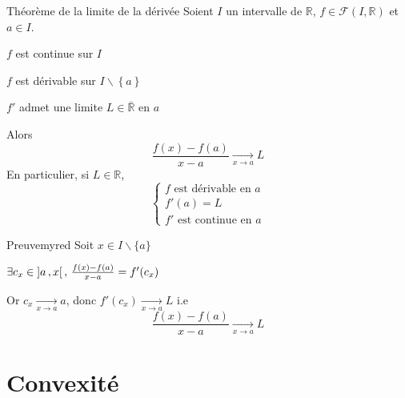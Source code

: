     \begin{theo}{Théorème de la limite de la dérivée}{}
        Soient $I$ un intervalle de $\mathbb{R}$, $f \in \mathcal{F}(I,\mathbb{R})$ et $a \in I$. 

        \begin{suppose}
            \item $f$ est continue sur $I$
            \item $f$ est dérivable sur $I \backslash \left\{ a \right\}$
            \item $f'$ admet une limite $L \in \bar{\mathbb{R}}$ en $a$
        \end{suppose}
        Alors \[ \frac{f(x)-f(a)}{x-a} \underset{x \rightarrow a}{\longrightarrow} L \]
        En particulier, si $L \in \mathbb{R}$, 
        \[ \left\{ \begin{array}{lll}
            f \text{ est dérivable en } a \\
            f'(a) = L \\
            f' \text{ est continue en } a
        \end{array} \right. \]
    \end{theo}

    \begin{demo}{Preuve}{myred}
        Soit $x \in I \backslash \{ a \}$
        
        $\exists  c_x \in \left] a \, , x \right[, \, \frac{f(x)-f(a)}{x-a} = f'(c_x)$
        
        Or $c_x \underset{x \rightarrow a}{\longrightarrow} a$, donc $f'(c_x) \underset{x \rightarrow a}{\longrightarrow} L$ i.e \[ \frac{f(x)-f(a)}{x-a} \underset{x \rightarrow a}{\longrightarrow} L \]
    \end{demo}

\section{Convexité}

